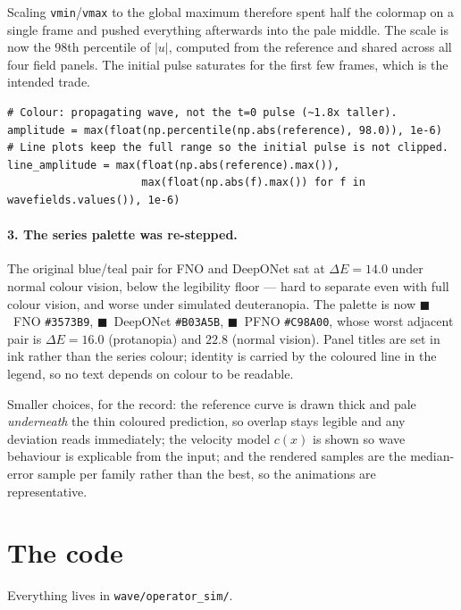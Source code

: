 \documentclass[11pt,a4paper]{article}
\begin{document}
Scaling \texttt{vmin}/\texttt{vmax} to the global maximum therefore spent half
the colormap on a single frame and pushed everything afterwards into the pale
middle. The scale is now the 98th percentile of $|u|$, computed from the
reference and shared across all four field panels. The initial pulse saturates
for the first few frames, which is the intended trade.

\begin{lstlisting}
# Colour: propagating wave, not the t=0 pulse (~1.8x taller).
amplitude = max(float(np.percentile(np.abs(reference), 98.0)), 1e-6)
# Line plots keep the full range so the initial pulse is not clipped.
line_amplitude = max(float(np.abs(reference).max()),
                     max(float(np.abs(f).max()) for f in wavefields.values()), 1e-6)
\end{lstlisting}

\paragraph{3. The series palette was re-stepped.} The original blue/teal pair
for FNO and DeepONet sat at $\Delta E=14.0$ under normal colour vision, below
the legibility floor --- hard to separate even with full colour vision, and
worse under simulated deuteranopia. The palette is now
\textcolor{fnoblue}{$\blacksquare$~FNO \texttt{\#3573B9}},
\textcolor{donrose}{$\blacksquare$~DeepONet \texttt{\#B03A5B}},
\textcolor{pfnogold}{$\blacksquare$~PFNO \texttt{\#C98A00}},
whose worst adjacent pair is $\Delta E=16.0$ (protanopia) and $22.8$ (normal
vision). Panel titles are set in ink rather than the series colour; identity is
carried by the coloured line in the legend, so no text depends on colour to be
readable.

\medskip\noindent
Smaller choices, for the record: the reference curve is drawn thick and pale
\emph{underneath} the thin coloured prediction, so overlap stays legible and any
deviation reads immediately; the velocity model $c(x)$ is shown so wave
behaviour is explicable from the input; and the rendered samples are the
median-error sample per family rather than the best, so the animations are
representative.

\section{The code}

Everything lives in \texttt{wave/operator\_sim/}.
\end{document}
